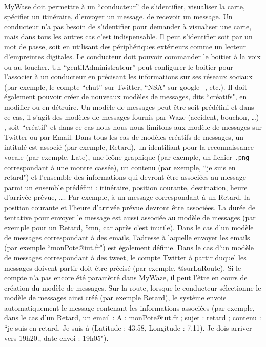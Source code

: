 \documentclass[12pt,French]{article}
\begin{document}
MyWase doit permettre à un ``conducteur'' de s'identifier, visualiser la carte, spécifier un itinéraire, d'envoyer un message, de recevoir un message.   
Un conducteur n'a pas  besoin de s'identifier pour demander à visualiser une carte, mais dans tous les autres cas  c'est  indispensable.  
Il  peut  s'identifier  soit  par  un  mot  de  passe,  soit  en  utilisant  des  périphériques extérieurs comme un lecteur d'empreintes digitales.  
Le conducteur doit  pouvoir commander le boitier à la voix ou au toucher. 
Un ``gentilAdministrateur'' peut configurer le boitier pour l'associer à un conducteur en  précisant les informations sur ses réseaux sociaux (par exemple, le compte ``chut'' sur Twitter, ``NSA" sur google+, etc.). 
Il doit également pouvoir créer de nouveaux modèles  de messages, dits ``créatifs", en modifier ou en détruire. 
Un modèle de messages peut  être soit prédéfini et dans ce cas, il s'agit des modèles de messages fournis par Waze  (accident,  bouchon, \ldots)  ,  soit  ``créatif"  et  dans ce  cas  nous nous  nous  limitons  aux  modèle de messages sur Twitter ou par Email.   
Dans tous les cas de modèles créatifs de  messages,  un  intitulé   est  associé  (par  exemple,  Retard),  un  identifiant  pour  la  reconnaissance vocale (par exemple, Late), une icône graphique (par  exemple, un  fichier \texttt{.png} correspondant à une montre cassée), un contenu (par exemple, ``je suis en retard") et l'ensemble des informations qui devront être associées au message  parmi  un  ensemble  prédéfini  : itinéraire, position courante, destination, heure d'arrivée prévue,  \ldots{}.
Par  exemple,  à  un  message  correspondant à un Retard, la position courante et l'heure d'arrivée prévue devront être  associées. 
La durée de tentative pour envoyer le message est aussi associée au modèle  de messages (par exemple pour un Retard,  5mn, car après c'est inutile). 
Dans le cas d'un  modèle de messages correspondant à des emails, l'adresse à laquelle envoyer les emails  (par exemple ``monPote@iut.fr")  est également définie. 
Dans le cas d'un modèle de  messages correspondant à des tweet, le compte Twitter à partir duquel les messages  doivent partir doit être précisé (par exemple, @surLaRoute).   
Si le compte n'a pas  encore été paramètré dans MyWaze, il peut l'être en cours de création du modèle de  messages. Sur la route, lorsque le conducteur sélectionne le modèle de messages ainsi créé (par  exemple  Retard),  le  système  envoie  automatiquement  le  message  contenant  les  informations associées (par exemple, dans le cas d'un Retard, un email :  A : monPote@iut.fr ; sujet : retard ;   contenu : ``je suis en retard. Je suis à (Latitude :  43.58, Longitude : 7.11). Je dois arriver vers 19h20., date envoi : 19h05").   
\end{document}

